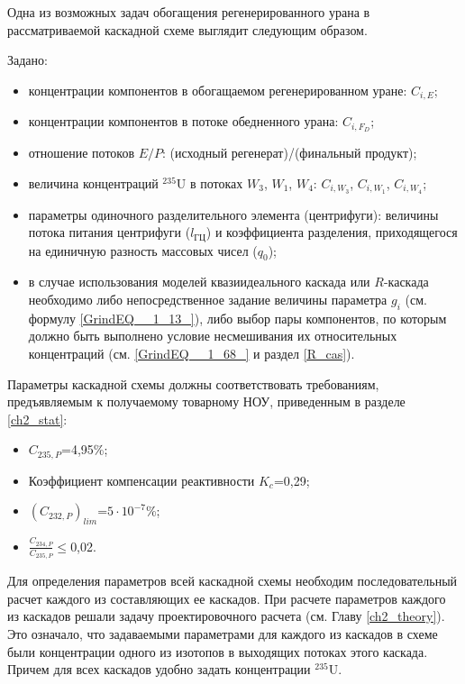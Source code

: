 Одна из возможных задач обогащения регенерированного урана в рассматриваемой каскадной схеме выглядит следующим образом.

Задано:

\begin{itemize}
    \item концентрации компонентов в обогащаемом регенерированном уране: $C_{i,{E}}$;
    \item концентрации компонентов в потоке обедненного урана: $C_{i,{F_{D}}}$;
    \item отношение потоков $E/P$: (исходный регенерат)/(финальный продукт);
    \item величина концентраций $^{235}$U в потоках $W_{3}$, $W_{1}$, $W_{4}$: $C_{i,{W_3}}$, $C_{i,{W_1}}$, $C_{i,{W_4}}$;
    \item параметры одиночного разделительного элемента (центрифуги): величины потока питания центрифуги ($l_\textit{ГЦ}$) и коэффициента разделения, приходящегося на единичную разность массовых чисел ($q_{0}$);
    \item в случае использования моделей квазиидеального каскада или $R$-каскада необходимо либо непосредственное задание величины параметра $g_i$ (см. формулу \ref{GrindEQ__1_13_}), либо выбор пары компонентов, по которым должно быть выполнено условие несмешивания их относительных концентраций (см. \ref{GrindEQ__1_68_} и раздел \ref{R_cas}).
\end{itemize}

Параметры каскадной схемы должны соответствовать требованиям, предъявляемым к получаемому товарному НОУ, приведенным в разделе \ref{ch2_stat}:

\begin{itemize}
    \item $C_{235,{P}}$=4,95\%;
    \item Коэффициент компенсации реактивности $K_{c}$=0,29;
    \item $(C_{232,{P}})_{lim}$=$5\cdot10^{-7}$\%;
    \item $\frac{C_{234,P}}{C_{235,P}}\le$0,02.
\end{itemize}

Для определения параметров всей каскадной схемы необходим последовательный расчет каждого из составляющих ее каскадов. При расчете параметров каждого из каскадов решали задачу проектировочного расчета (см. Главу \ref{ch2_theory}). Это означало, что задаваемыми параметрами для каждого из каскадов в схеме были концентрации одного из изотопов в выходящих потоках этого каскада. Причем для всех каскадов удобно задать концентрации $^{235}$U.

